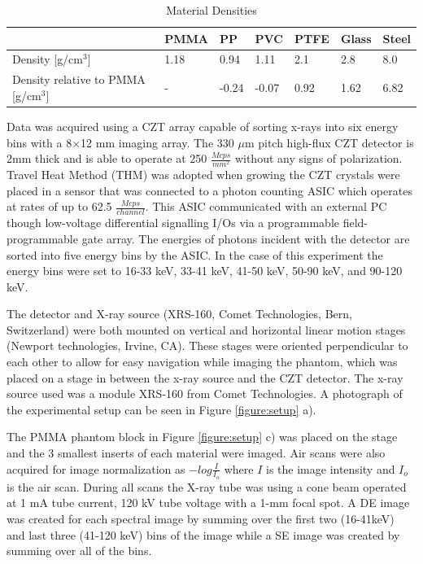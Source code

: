 \documentclass[a4paper,11pt]{article}
\begin{document}
\begin{table}[]
\begin{tabular}{lllllll}

                                                       & PMMA & PP    & PVC   & PTFE & Glass & Steel \\ \hline
Density {[}g/cm$^3${]}                  & 1.18 & 0.94  & 1.11  & 2.1  & 2.8   & 8.0   \\
Density relative to PMMA {[}g/cm$^3${]} & -    & -0.24 & -0.07 & 0.92 & 1.62  & 6.82 
\end{tabular}
\label{table:densities}
\caption{Material Densities}
\end{table}

Data was acquired using a CZT array capable of sorting x-rays into six energy bins with a 8$\times$12 mm imaging array. The 330 $\mu$m pitch high-flux CZT detector is 2mm thick and is able to operate at 250 $\frac{Mcps}{mm^2}$ without any signs of polarization. Travel Heat Method (THM) was adopted when growing the CZT crystals were placed in a sensor that was connected to a photon counting ASIC which operates at rates of up to 62.5 $\frac{Mcps}{channel}$. This ASIC communicated with an external PC though low-voltage differential signalling I/Os via a programmable field-programmable gate array. The energies of photons incident with the detector are sorted into five energy bins by the ASIC. In the case of this experiment the energy bins were set to 16-33 keV, 33-41 keV, 41-50 keV, 50-90 keV, and 90-120 keV.

The detector and X-ray source (XRS-160, Comet Technologies, Bern, Switzerland) were both mounted on vertical and horizontal linear motion stages (Newport technologies, Irvine, CA). These stages were oriented perpendicular to each other to allow for easy navigation while imaging the phantom, which was placed on a stage in between the x-ray source and the CZT detector. The x-ray source used was a module XRS-160 from Comet Technologies. A photograph of the experimental setup can be seen in Figure \ref{figure:setup} a). 

The PMMA phantom block in Figure \ref{figure:setup} c) was placed on the stage and the 3 smallest inserts of each material were imaged. Air scans were also acquired for image normalization as $-log\frac{I}{I_o}$ where $I$ is the image intensity and $I_o$ is the air scan. During all scans the X-ray tube was using a cone beam operated at 1 mA tube current, 120 kV tube voltage with a 1-mm focal spot. A DE image was created for each spectral image by summing over the first two (16-41keV) and last three 
(41-120 keV) bins of the image while a SE image was created by summing over all of the bins.
\end{document}
